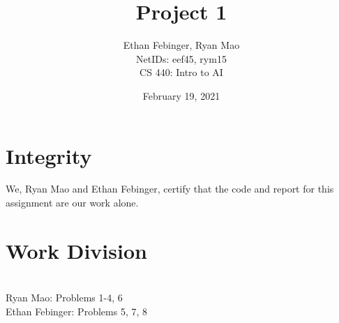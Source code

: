 \documentclass[12pt, twoside]{article}
\newcommand{\name}{Ethan Febinger, Ryan Mao \\ NetIDs: eef45, rym15}
\newcommand{\class}{CS 440: Intro to AI}
\newcommand{\hwTitle}{Project 1} %
\newcommand{\due}{February 19, 2021} %
\begin{document}
 
 
\title{\hwTitle} %
\author{\name\\  %
\class} %
\date{\due}
 
\maketitle

\section{Integrity}

We, Ryan Mao and Ethan Febinger, certify that the code and report for this assignment are our work alone.

\section{Work Division}
\\
Ryan Mao: Problems 1-4, 6
\\
Ethan Febinger: Problems 5, 7, 8
\end{document}
